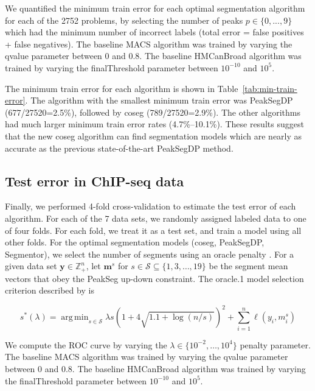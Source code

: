 \documentclass{article}
\DeclareMathOperator*{\argmin}{arg\,min}
\newcommand{\ZZ}{\mathbb Z}
\begin{document}
We quantified the minimum train error for each optimal segmentation
algorithm for each of the 2752 problems, by selecting the number of
peaks $p\in\{0, ..., 9\}$ which had the minimum number of incorrect
labels (total error = false positives + false negatives). The baseline
MACS algorithm was trained by varying the qvalue parameter between 0
and 0.8. The baseline HMCanBroad algorithm was trained by varying the
finalThreshold parameter between $10^{-10}$ and
$10^5$.

The minimum train error for each algorithm is shown in
Table~\ref{tab:min-train-error}. The algorithm with the smallest
minimum train error was PeakSegDP (677/27520=2.5\%), followed by coseg
(789/27520=2.9\%). The other algorithms had much larger minimum train
error rates (4.7\%--10.1\%). These results suggest that the new coseg
algorithm can find segmentation models which are nearly as accurate as
the previous state-of-the-art PeakSegDP method.


\subsection{Test error in ChIP-seq data}

Finally, we performed 4-fold cross-validation to estimate the test
error of each algorithm. For each of the 7 data sets, we randomly
assigned labeled data to one of four folds. For each fold, we treat it
as a test set, and train a model using all other folds. For the
optimal segmentation models (coseg, PeakSegDP, Segmentor), we select
the number of segments using an oracle penalty
\citep{cleynen2013segmentation}. For a given data set
$\mathbf y\in\ZZ_+^n$, let $\mathbf m^s$ for
$s\in\mathcal S\subseteq \{1, 3,\dots, 19\}$ be the segment mean
vectors that obey the PeakSeg up-down constraint. The oracle.1 model
selection criterion described by \citet{HOCKING-PeakSeg} is

\begin{equation}
  \label{eq:oracle}
  s^*(\lambda) = \argmin_{s\in\mathcal S}
  \lambda s\left(1 + 4\sqrt{1.1 + \log(n/s)}\right)^2
  +\sum_{i=1}^n \ell(y_i, m_i^s)
\end{equation}

We compute the ROC curve by varying the
$\lambda\in\{10^{-2}, \dots,10^4\}$ penalty parameter. The baseline
MACS algorithm was trained by varying the qvalue parameter between 0
and 0.8. The baseline HMCanBroad algorithm was trained by varying the
finalThreshold parameter between $10^{-10}$ and $10^5$. 
\end{document}
